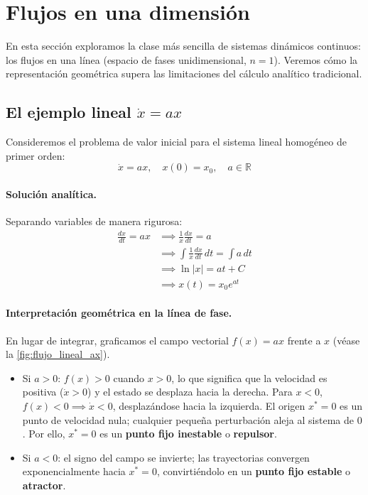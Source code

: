 \section{Flujos en una dimensión}
\label{sec:flujos1d}

En esta sección exploramos la clase más sencilla de sistemas dinámicos continuos: los flujos en una línea (espacio de fases unidimensional, $n=1$). Veremos cómo la representación geométrica supera las limitaciones del cálculo analítico tradicional.

\subsection{El ejemplo lineal $\dot{x} = ax$}

Consideremos el problema de valor inicial para el sistema lineal homogéneo de primer orden:
\begin{equation}
    \dot{x} = ax, \quad x(0) = x_0, \quad a \in \mathbb{R}
    \label{eq:flujo_lineal}
\end{equation}

\paragraph{Solución analítica.}
Separando variables de manera rigurosa:
\begin{align}
    \frac{dx}{dt} = ax &\implies \frac{1}{x} \frac{dx}{dt} = a \nonumber \\
    &\implies \int \frac{1}{x} \frac{dx}{dt} \, dt = \int a \, dt \nonumber \\
    &\implies \ln|x| = at + C \nonumber \\
    &\implies x(t) = x_0 e^{at}
\end{align}

\paragraph{Interpretación geométrica en la línea de fase.}
En lugar de integrar, graficamos el campo vectorial $f(x) = ax$ frente a $x$ (véase la \cref{fig:flujo_lineal_ax}).
\begin{itemize}
    \item Si $a > 0$: $f(x) > 0$ cuando $x > 0$, lo que significa que la velocidad es positiva ($\dot{x} > 0$) y el estado se desplaza hacia la derecha. Para $x < 0$, $f(x) < 0 \implies \dot{x} < 0$, desplazándose hacia la izquierda. El origen $x^* = 0$ es un punto de velocidad nula; cualquier pequeña perturbación aleja al sistema de $0$. Por ello, $x^* = 0$ es un \textbf{punto fijo inestable} o \textbf{repulsor}.
    \item Si $a < 0$: el signo del campo se invierte; las trayectorias convergen exponencialmente hacia $x^* = 0$, convirtiéndolo en un \textbf{punto fijo estable} o \textbf{atractor}.
\end{itemize}

